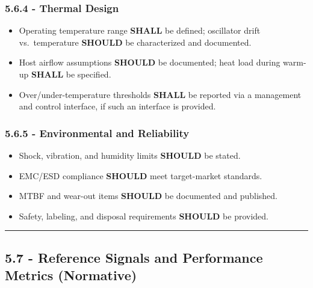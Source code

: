 \documentclass[
]{article}
\begin{document}
\subsubsection{5.6.4 - Thermal Design}\label{thermal-design}

\begin{itemize}
\item
  Operating temperature range \textbf{SHALL} be defined; oscillator
  drift vs.~temperature \textbf{SHOULD} be characterized and
  documented.\\
\item
  Host airflow assumptions \textbf{SHOULD} be documented; heat load
  during warm-up \textbf{SHALL} be specified.\\
\item
  Over/under-temperature thresholds \textbf{SHALL} be reported via a
  management and control interface, if such an interface is provided.
\end{itemize}

\subsubsection{5.6.5 - Environmental and
Reliability}\label{environmental-and-reliability}

\begin{itemize}
\item
  Shock, vibration, and humidity limits \textbf{SHOULD} be stated.\\
\item
  EMC/ESD compliance \textbf{SHOULD} meet target-market standards.\\
\item
  MTBF and wear-out items \textbf{SHOULD} be documented and published.\\
\item
  Safety, labeling, and disposal requirements \textbf{SHOULD} be
  provided.
\end{itemize}

\begin{center}\rule{0.5\linewidth}{0.5pt}\end{center}

\subsection{5.7 - Reference Signals and Performance Metrics
(Normative)}\label{reference-signals-and-performance-metrics-normative}
\end{document}
